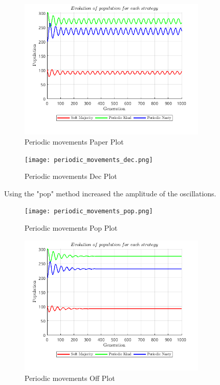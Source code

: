 \documentclass[12pt]{report}
\begin{document}
\begin{figure}[H]
    \centering
    \includegraphics[width=0.8\textwidth]{periodic_movements_paper.png}
    \caption{Periodic movements Paper Plot}
\end{figure}
\begin{figure}[H]
    \centering
    \texttt{[image: periodic\_movements\_dec.png]}
    \caption{Periodic movements Dec Plot}
\end{figure}
Using the "pop" method increased the amplitude of the oscillations.
\begin{figure}[H]
    \centering
    \texttt{[image: periodic\_movements\_pop.png]}
    \caption{Periodic movements Pop Plot}
\end{figure}
\begin{figure}[H]
    \centering
    \includegraphics[width=0.8\textwidth]{periodic_movements_off.png}
    \caption{Periodic movements Off Plot}
\end{figure}

\newpage
\end{document}
